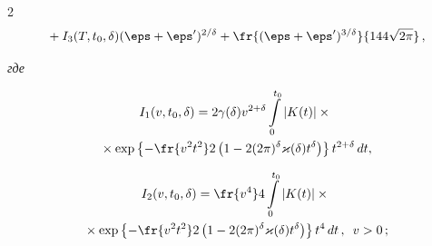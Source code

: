 \begin{multicols}{2}
\begin{multline*}
{}+I_3(T,t_0,\delta) (\eps+\eps')^{2/\delta}+


\fr{(\eps+\eps')^{3/\delta}}{144\sqrt{2\pi}}\,,


\end{multline*}


\textit{где}





\vspace*{-12pt}





\noindent


\begin{multline*}


I_1(v,t_0,\delta)


=2\gamma(\delta)v^{2+\delta}\int\limits_0^{t_0}\left|K(t)\right|\times{}\\


{}\times


\exp\left\{-\fr{v^2t^2}2 \left(1-2(2\pi)^\delta\varkappa(\delta)t^{\delta}


\right)\right\} t^{2+\delta}\,dt,


\end{multline*}





\vspace*{-12pt}





\noindent


\begin{multline*}


I_2(v,t_0,\delta)= \fr{v^4}4\int\limits_0^{t_0}\left|K(t)\right|\times{}\\


{}\times


\exp\left\{-\fr{v^2t^2}2 \left(1-2(2\pi)^\delta\varkappa(\delta)t^{\delta}


\right)\right\} t^4\, dt\,,\enskip v>0\,;


\end{multline*}





\vspace*{-12pt}





\noindent


\begin{multline*}



\end{multline*}
\end{multicols}

